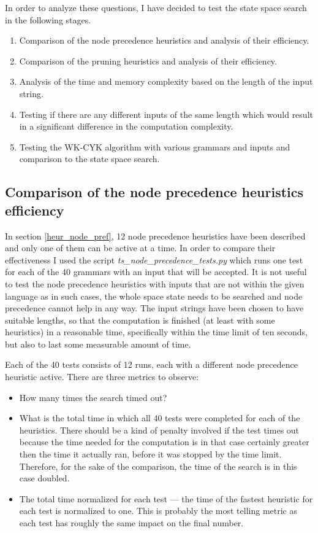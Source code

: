 In order to analyze these questions, I have decided to test the state space search in the following stages.
\begin{enumerate}
  \item{Comparison of the node precedence heuristics and analysis of their efficiency.}
  \item{Comparison of the pruning heuristics and analysis of their efficiency.}
  \item{Analysis of the time and memory complexity based on the length of the input string.}
  \item{Testing if there are any different inputs of the same length which would result in a significant difference in the computation complexity.}
  \item{Testing the WK-CYK algorithm with various grammars and inputs and comparison to the state space search.}
\end{enumerate}

\subsection{Comparison of the node precedence heuristics efficiency}
In section \ref{heur_node_pref}, 12 node precedence heuristics have been described and only one of them can be active at a time.
In order to compare their effectiveness I used the script \textit{ts\_node\_prece\-dence\_tests.py} which runs one test for each of the 40 grammars with an input that will be accepted. It is not useful to test the node precedence heuristics with inputs that are not within the given language as in such cases, the whole space state needs to be searched and node precedence cannot help in any way. The input strings have been chosen to have suitable lengths, so that the computation is finished (at least with some heuristics) in a reasonable time, specifically within the time limit of ten seconds, but also to last some measurable amount of time.

Each of the 40 tests consists of 12 runs, each with a different node precedence heuristic active. There are three metrics to observe:
\begin{itemize}
  \item{How many times the search timed out?}

  \item{What is the total time in which all 40 tests were completed for each of the heuristics. There should be a kind of penalty involved if the test times out because the time needed for the computation is in that case certainly greater then the time it actually ran, before it was stopped by the time limit. Therefore, for the sake of the comparison, the time of the search is in this case doubled.}

  \item{The total time normalized for each test --- the time of the fastest heuristic for each test is normalized to one. This is probably the most telling metric as each test has roughly the same impact on the final number.}
\end{itemize}


